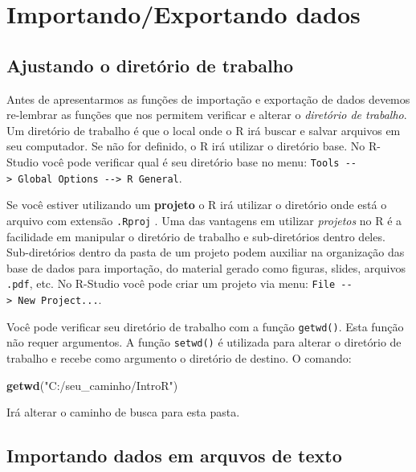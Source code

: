 \documentclass[
]{book}
\newenvironment{Shaded}{\begin{snugshade}}{\end{snugshade}}
\newcommand{\KeywordTok}[1]{\textcolor[rgb]{0.13,0.29,0.53}{\textbf{#1}}}
\newcommand{\NormalTok}[1]{#1}
\newcommand{\StringTok}[1]{\textcolor[rgb]{0.31,0.60,0.02}{#1}}
\begin{document}
\hypertarget{importe}{%
\chapter{Importando/Exportando dados}\label{importe}}

\hypertarget{ajustando-o-diretuxf3rio-de-trabalho}{%
\section{Ajustando o diretório de trabalho}\label{ajustando-o-diretuxf3rio-de-trabalho}}

Antes de apresentarmos as funções de importação e exportação de dados devemos re-lembrar as funções que nos permitem verificar e alterar o \emph{diretório de trabalho}. Um diretório de trabalho é que o local onde o R irá buscar e salvar arquivos em seu computador. Se não for definido, o R irá utilizar o diretório base. No R-Studio você pode verificar qual é seu diretório base no menu: \texttt{Tools\ -\/-\textgreater{}\ Global\ Options\ -\/-\textgreater{}\ R\ General}.

Se você estiver utilizando um \textbf{projeto} o R irá utilizar o diretório onde está o arquivo com extensão \texttt{.Rproj} . Uma das vantagens em utilizar \emph{projetos} no R é a facilidade em manipular o diretório de trabalho e sub-diretórios dentro deles. Sub-diretórios dentro da pasta de um projeto podem auxiliar na organização das base de dados para importação, do material gerado como figuras, slides, arquivos \texttt{.pdf}, etc. No R-Studio você pode criar um projeto via menu: \texttt{File\ -\/-\textgreater{}\ New\ Project...}.

Você pode verificar seu diretório de trabalho com a função \texttt{getwd()}. Esta função não requer argumentos. A função \texttt{setwd()} é utilizada para alterar o diretório de trabalho e recebe como argumento o diretório de destino. O comando:

\begin{Shaded}
\begin{Highlighting}[]
\KeywordTok{getwd}\NormalTok{(}\StringTok{"C:/seu_caminho/IntroR"}\NormalTok{)}
\end{Highlighting}
\end{Shaded}

Irá alterar o caminho de busca para esta pasta.

\hypertarget{importando-dados-em-arquvos-de-texto}{%
\section{Importando dados em arquvos de texto}\label{importando-dados-em-arquvos-de-texto}}
\end{document}
